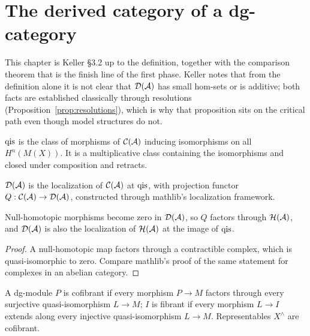 \chapter{The derived category of a dg-category}
\label{ch:derived}

This chapter is Keller \S 3.2 up to the definition, together with the comparison theorem
that is the finish line of the first phase. Keller notes that from the definition alone it is
not clear that $\mathcal{D}(\mathcal{A})$ has small hom-sets or is additive; both facts are established
classically through resolutions (Proposition~\ref{prop:resolutions}), which is why that
proposition sits on the critical path even though model structures do not.

\begin{definition}
\label{def:dg-qis}
$\mathrm{qis}$ is the class of morphisms of $\mathcal{C}(\mathcal{A})$ inducing isomorphisms on all
$H^n(M(X))$. It is a multiplicative class containing the isomorphisms and closed under
composition and retracts.
\end{definition}

\begin{definition}
\label{def:dg-derived-category}
$\mathcal{D}(\mathcal{A})$ is the localization of $\mathcal{C}(\mathcal{A})$ at $\mathrm{qis}$, with projection functor
$Q : \mathcal{C}(\mathcal{A}) \to \mathcal{D}(\mathcal{A})$, constructed through mathlib's localization framework.
\end{definition}

\begin{lemma}
\label{lem:derived-via-homotopy}
Null-homotopic morphisms become zero in $\mathcal{D}(\mathcal{A})$, so $Q$ factors through
$\mathcal{H}(\mathcal{A})$, and $\mathcal{D}(\mathcal{A})$ is also the localization of $\mathcal{H}(\mathcal{A})$ at the image of
$\mathrm{qis}$.
\end{lemma}
\begin{proof}
A null-homotopic map factors through a contractible complex, which is quasi-isomorphic to
zero. Compare mathlib's proof of the same statement for complexes in an abelian category.
\end{proof}

\begin{definition}
\label{def:cofibrant-fibrant}
A dg-module $P$ is cofibrant if every morphism $P \to M$ factors through every surjective
quasi-isomorphism $L \to M$; $I$ is fibrant if every morphism $L \to I$ extends along every
injective quasi-isomorphism $L \to M$. Representables $X^{\wedge}$ are cofibrant.
\end{definition}

